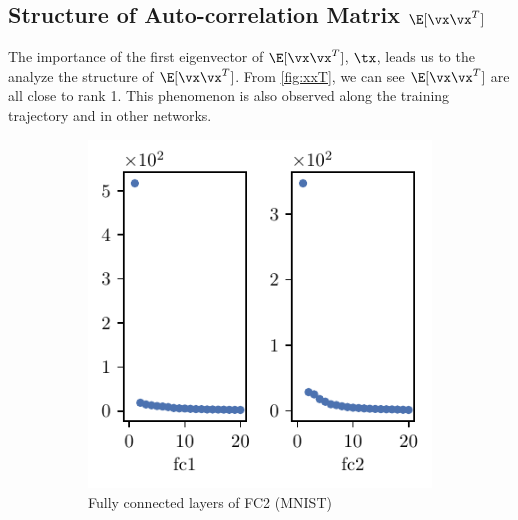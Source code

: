 \subsection{Structure of Auto-correlation Matrix \texorpdfstring{$\E[\vx\vx^T]$}{ExxT}}
\label{sec:xxT}
The importance of the first eigenvector of $\E[\vx\vx^T]$, $\tx$, leads us to the analyze the structure of $\E[\vx\vx^T]$. From \cref{fig:xxT}, we can see $\E[\vx\vx^T]$ are all close to rank 1. This phenomenon is also observed along the training trajectory and in other networks.
\begin{figure}[th]
    \centering
    \begin{subfigure}[b]{0.32\textwidth}
        \centering
        \captionsetup{justification=centering}
        \includegraphics[width=\textwidth]{Figures/Eigenspectrum/xxT/xxT_sigval_d20_MNIST_Exp1_FC2_fixlr0.01R1_E-1_fc1fc2.pdf}
        \caption{Fully connected layers of FC2 (MNIST)}
        \label{fig:xxT_sig_fc2}
    \end{subfigure}
    \hfill
    \begin{subfigure}[b]{0.32\textwidth}
        \centering
        \captionsetup{justification=centering}

\end{subfigure}
\end{figure}
